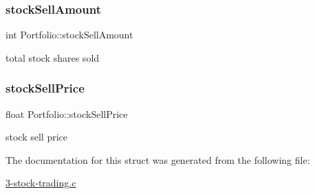 \subsubsection{\texorpdfstring{stockSellAmount}{stockSellAmount}}
{\footnotesize\ttfamily int Portfolio\+::stock\+Sell\+Amount}

total stock shares sold \mbox{\label{structPortfolio_ac920982854f6d7b0e84cb0610a0482ce}} 
\subsubsection{\texorpdfstring{stockSellPrice}{stockSellPrice}}
{\footnotesize\ttfamily float Portfolio\+::stock\+Sell\+Price}

stock sell price 

The documentation for this struct was generated from the following file\+:\begin{DoxyCompactItemize}
\item 
\mbox{\hyperlink{3-stock-trading_8c}{3-\/stock-\/trading.\+c}}\end{DoxyCompactItemize}
